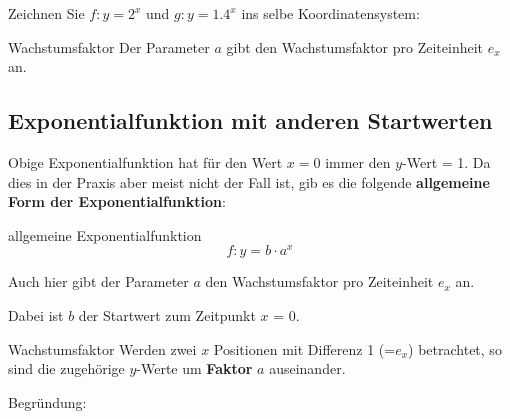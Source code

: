 Zeichnen Sie $f: y=2^x$ und $g: y=1.4^x$ ins selbe Koordinatensystem:





\begin{bemerkung}{Wachstumsfaktor}{}
Der Parameter $a$ gibt den Wachstumsfaktor pro Zeiteinheit $e_x$ an.
\end{bemerkung}

\newpage

\subsection{Exponentialfunktion mit anderen Startwerten}

Obige Exponentialfunktion hat für den Wert $x=0$ immer den $y$-Wert = 1. Da dies in der Praxis aber meist nicht der Fall ist, gib es die folgende \textbf{allgemeine Form der Exponentialfunktion}:

\begin{definition}{allgemeine Exponentialfunktion}{}
$$f: y = b\cdot{}a^x$$

Auch hier gibt der Parameter $a$ den Wachstumsfaktor pro Zeiteinheit $e_x$ an.

Dabei ist $b$ der Startwert zum Zeitpunkt $x$ = 0.
\end{definition}



\begin{bemerkung}{Wachstumsfaktor}{}{}
Werden zwei $x$ Positionen mit Differenz 1 (=$e_x$) betrachtet, so sind
die zugehörige $y$-Werte um \textbf{Faktor} $a$ auseinander.
\end{bemerkung}

Begründung:
\newpage



